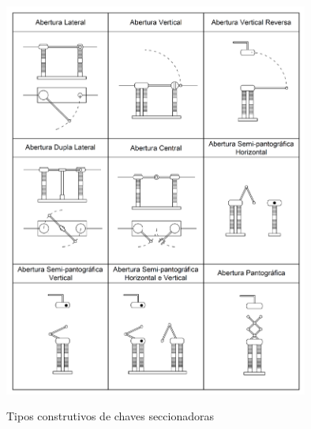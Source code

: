 \documentclass[a5paper,english,spanish,brazil]{ufsc-thesis}
\begin{document}
\begin{figure}[htb]
  \caption{Tipos construtivos de chaves seccionadoras}
  \centering
  \includegraphics[width=10cm]{chavesec.pdf}
  \label{fig:chavesec}
\end{figure}
\end{document}
